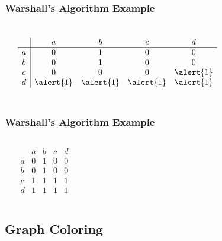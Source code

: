 \documentclass[dvipsnames]{beamer}
\begin{document}
\begin{frame}
  \frametitle{Warshall's Algorithm Example}

  \begin{columns}
    \begin{center}
    \end{center}

    \[
      \begin{array}{c|cccc}
            & a & b & c & d\\\hline
          a & 0 & 1 & 0 & 0\\
          b & 0 & 1 & 0 & 0\\
          c & 0 & 0 & 0 & \alert{1}\\
          d & \alert{1} & \alert{1} & \alert{1} & \alert{1}
      \end{array}
    \]
  \end{columns}
\end{frame}

\begin{frame}
  \frametitle{Warshall's Algorithm Example}

  \begin{columns}
    \begin{center}
    \end{center}

    \[
      \begin{array}{c|cccc}
            & a & b & c & d\\\hline
          a & 0 & 1 & 0 & 0\\
          b & 0 & 1 & 0 & 0\\
          c & 1 & 1 & 1 & 1\\
          d & 1 & 1 & 1 & 1
      \end{array}
    \]
  \end{columns}
\end{frame}

\subsection{Graph Coloring}
\end{document}
